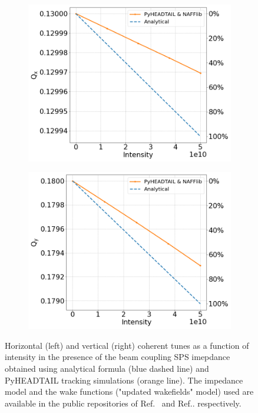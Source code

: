 \begin{figure}[!ht]
    \centering
    \begin{subfigure}[t]{0.45\textwidth}
        \centering
        \includegraphics[width=1\textwidth]{images/Ch7/Qx_vs_intensity_complete_impedance_sps_q26model_MD2018_parameters.png}
    \end{subfigure}
    \hfill
    \begin{subfigure}[t]{0.45\textwidth}
        \centering
        \includegraphics[width=1\textwidth]{images/Ch7/Qy_vs_intensity_complete_impedance_sps_q26model_MD2018_parameters.png}
    \end{subfigure}
    \hfill
     \caption{Horizontal (left) and vertical (right) coherent tunes as a function of intensity in the presence of the beam coupling SPS imepdance obtained using analytical formula (blue dashed line) and PyHEADTAIL tracking simulations (orange line). The impedance model and the wake functions ("updated wakefields" model) used are available in the public repositories of Ref.~\cite{sps_impedance_model_git} and Ref.. respectively.} %
     \label{fig:sps_coherent_DQ_vs_intensity_updated_model}
 \end{figure}


